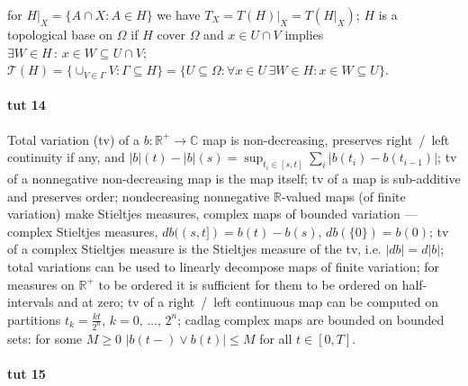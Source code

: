 \documentclass[a4paper]{article}
\newcommand{\real}{\mathbb{R}}
\newcommand{\cplx}{\mathbb{C}}
\begin{document}
for $
  H\vert_X
    = \{A\cap X\colon A \in H\}
$ we have $
  T_X
    = T(H) \vert_X
    = T(H \vert_X)
$;
%
$H$ is a topological base on $\Omega$ if $H$ cover $\Omega$ and $x \in U \cap V$ implies $
  \exists W \in H
  \,\colon\, x \in W \subseteq U \cap V
$;
%
$
\mathcal{T}(H)
  = \{
    \cup_{V \in \Gamma} V
    \colon \Gamma \subseteq H
  \}
  = \{
    U \subseteq \Omega
    \colon \forall x\in U\, \exists W\in H
    \colon x \in W \subseteq U
  \}
$.



\paragraph{tut 14} %
\label{par:tut_14}

Total variation (tv) of a $b\colon \real^+ \to \cplx$ map is non-decreasing, preserves
right~/~left continuity if any, and
$|b|(t) - |b|(s) = \sup_{t_i \in [s, t]} \sum_i |b(t_i) - b(t_{i-1})|$;
%
tv of a nonnegative non-decreasing map is the map itself;
%
tv of a map is sub-additive and preserves order;
%
nondecreasing nonnegative $\real$-valued maps (of finite variation) make Stieltjes
measures, complex maps of bounded variation --- complex Stieltjes measures,
$db((s,t]) = b(t) - b(s)$, $db(\{0\}) = b(0)$;
%
tv of a complex Stieltjes measure is the Stieltjes measure of the tv, i.e. $|db| = d|b|$;
%
total variations can be used to linearly decompose maps of finite variation;
%
for measures on $\real^+$ to be ordered it is sufficient for them to be ordered on
half-intervals and at zero;
%
tv of a right~/~left continuous map can be computed on partitions
$t_k = \tfrac{k t}{2^n}$, $k=0,\, \ldots,\,2^n$;
%
cadlag complex maps are bounded on bounded sets: for some $M\geq 0$
$|b(t-) \vee b(t)| \leq M$ for all $t \in [0, T]$.



\paragraph{tut 15} %
\label{par:tut_15}
\end{document}
